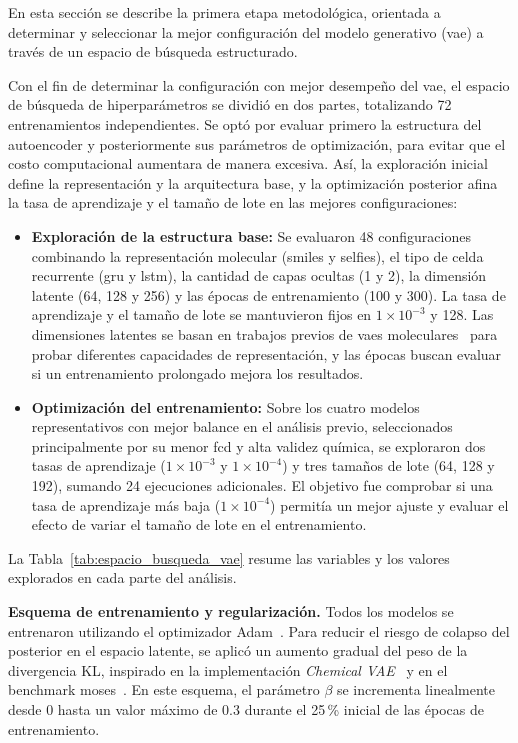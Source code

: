 En esta sección se describe la primera etapa metodológica, orientada a determinar y seleccionar la mejor configuración del modelo generativo (\gls{vae}) a través de un espacio de búsqueda estructurado.

Con el fin de determinar la configuración con mejor desempeño del \gls{vae}, el espacio de búsqueda de hiperparámetros se dividió en dos partes, totalizando 72 entrenamientos independientes. Se optó por evaluar primero la estructura del autoencoder y posteriormente sus parámetros de optimización, para evitar que el costo computacional aumentara de manera excesiva. Así, la exploración inicial define la representación y la arquitectura base, y la optimización posterior afina la tasa de aprendizaje y el tamaño de lote en las mejores configuraciones:

\begin{itemize}
    \item \textbf{Exploración de la estructura base:} Se evaluaron 48 configuraciones combinando la representación molecular (\gls{smiles} y \gls{selfies}), el tipo de celda recurrente (\gls{gru} y \gls{lstm}), la cantidad de capas ocultas (1 y 2), la dimensión latente (64, 128 y 256) y las épocas de entrenamiento (100 y 300). La tasa de aprendizaje y el tamaño de lote se mantuvieron fijos en $1 \times 10^{-3}$ y 128. Las dimensiones latentes se basan en trabajos previos de \glspl{vae} moleculares~\cite{GBWHLDSA18} para probar diferentes capacidades de representación, y las épocas buscan evaluar si un entrenamiento prolongado mejora los resultados.
    \item \textbf{Optimización del entrenamiento:} Sobre los cuatro modelos representativos con mejor balance en el análisis previo, seleccionados principalmente por su menor \gls{fcd} y alta validez química, se exploraron dos tasas de aprendizaje ($1 \times 10^{-3}$ y $1 \times 10^{-4}$) y tres tamaños de lote (64, 128 y 192), sumando 24 ejecuciones adicionales. El objetivo fue comprobar si una tasa de aprendizaje más baja ($1 \times 10^{-4}$) permitía un mejor ajuste y evaluar el efecto de variar el tamaño de lote en el entrenamiento.
\end{itemize}

La Tabla~\ref{tab:espacio_busqueda_vae} resume las variables y los valores explorados en cada parte del análisis.



\textbf{Esquema de entrenamiento y regularización.} Todos los modelos se entrenaron utilizando el optimizador Adam~\cite{kingma2014adam}. Para reducir el riesgo de colapso del posterior en el espacio latente, se aplicó un aumento gradual del peso de la divergencia KL, inspirado en la implementación \textit{Chemical VAE}~\cite{GBWHLDSA18} y en el benchmark \gls{moses}~\cite{polykovskiy2020molecular}. En este esquema, el parámetro $\beta$ se incrementa linealmente desde 0 hasta un valor máximo de $0.3$ durante el 25\,\% inicial de las épocas de entrenamiento.

